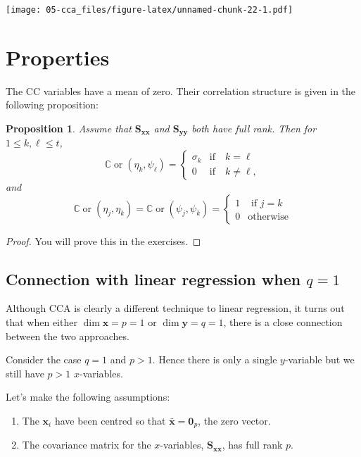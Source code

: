 \documentclass[]{book}
\providecommand{\tightlist}{%
  \setlength{\itemsep}{0pt}\setlength{\parskip}{0pt}}
\newtheorem{proposition}{Proposition}[chapter]
\theoremstyle{definition}
\theoremstyle{definition}
\theoremstyle{definition}
\theoremstyle{remark}
\begin{document}
\texttt{[image: 05-cca\_files/figure-latex/unnamed-chunk-22-1.pdf]}

\hypertarget{properties}{%
\section{Properties}\label{properties}}

The CC variables have a mean of zero. Their correlation structure is given in the following proposition:

\begin{proposition}
\protect\hypertarget{prp:ccavar}{}{\label{prp:ccavar} }Assume that \(\mathbf S_{\mathbf x\mathbf x}\) and \(\mathbf S_{\mathbf y\mathbf y}\) both have full rank. Then for \(1 \leq k,\ell \leq t\),
\[
{\mathbb{C}\operatorname{or}}(\eta_k,  \psi_{\ell})=\begin{cases} \sigma_k &\text{if} \quad k=\ell\\
0 & \text{if} \quad k \neq \ell, \end{cases}
\]
and
\[{\mathbb{C}\operatorname{or}}(\eta_j, \eta_k)= {\mathbb{C}\operatorname{or}}(\psi_j, \psi_k)=\begin{cases}
1 &\mbox{ if } j=k\\
0 &\mbox{otherwise}
\end{cases}
\]
\end{proposition}

\begin{proof}
{}You will prove this in the exercises.
\end{proof}

\hypertarget{connection-with-linear-regression-when-q1}{%
\subsection{\texorpdfstring{Connection with linear regression when \(q=1\)}{Connection with linear regression when q=1}}\label{connection-with-linear-regression-when-q1}}

Although CCA is clearly a different technique to linear regression, it turns out that when either \(\dim \mathbf x=p=1\) or \(\dim \mathbf y=q=1\), there is a close connection between the two approaches.

Consider the case \(q=1\) and \(p>1\). Hence there is only a single \(y\)-variable but we still have \(p>1\) \(x\)-variables.

Let's make the following assumptions:

\begin{enumerate}
\def\labelenumi{\arabic{enumi}.}
\tightlist
\item
  The \(\mathbf x_i\) have been centred so that \(\bar{\mathbf x}={\mathbf 0}_p\), the zero vector.
\item
  The covariance matrix for the \(x\)-variables, \(\mathbf S_{\mathbf x\mathbf x}\), has full rank \(p\).
\end{enumerate}
\end{document}
